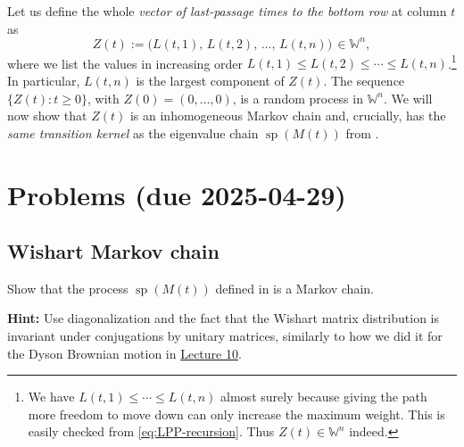 \documentclass[letterpaper,11pt,oneside,reqno]{article}
\numberwithin{equation}{section}
\theoremstyle{definition}
\begin{document}
Let us define the whole \emph{vector of last-passage times to the bottom row} at column $t$ as
\[ Z(t) := \big( L(t,1),\, L(t,2),\, \dots,\, L(t,n)\big)\,\in \mathbb{W}^n, \]
where we list the values in increasing order $L(t,1)\le
L(t,2)\le \cdots \le L(t,n)$.\footnote{We have $L(t,1)\le
\cdots\le L(t,n)$ almost surely because giving the path more
freedom to move down can only increase the maximum weight.
This is easily checked from \eqref{eq:LPP-recursion}. Thus
$Z(t)\in \mathbb{W}^n$ indeed.} In particular, $L(t,n)$ is
the largest component of $Z(t)$. The sequence
$\{Z(t):t\ge0\}$, with $Z(0)=(0,\dots,0)$, is a random
process in $\mathbb{W}^n$. We will now show that $Z(t)$ is an inhomogeneous Markov
chain and, crucially, has the \emph{same transition kernel}
as the eigenvalue chain $\operatorname{sp}(M(t))$ from
.


































\appendix
\setcounter{section}{12}

\section{Problems (due 2025-04-29)}

\subsection{Wishart Markov chain}
\label{prob:Markov}

Show that the
process $\operatorname{sp}(M(t))$
defined in 
is a Markov chain.

\medskip
\noindent
\textbf{Hint:} Use diagonalization and
the fact that the Wishart matrix distribution is invariant under
conjugations by unitary matrices,
similarly to how we did it for the Dyson Brownian motion in
\href{https://lpetrov.cc/rmt25/rmt25-notes/rmt2025-l10.pdf}{Lecture 10}.
\end{document}
